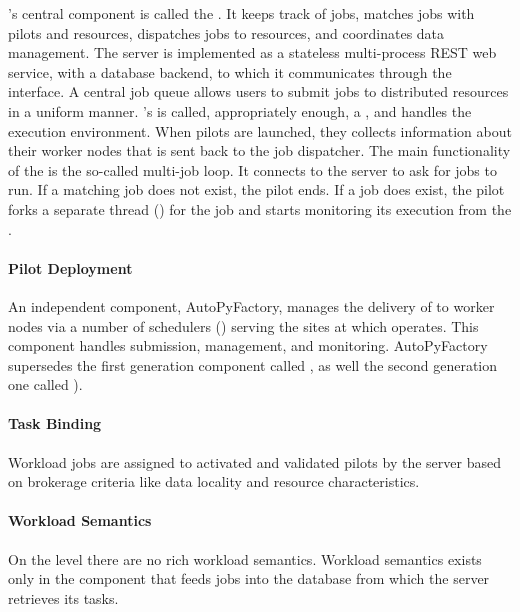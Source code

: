 \documentclass{sig-alternate}
\begin{document}
\panda's central component is called the . It keeps track
of jobs, matches jobs with pilots and resources, dispatches jobs to resources,
and coordinates data management.
The \panda server is implemented as a stateless multi-process REST web service,
with a database backend, to which it communicates through the 
interface.
A central job queue allows users to submit jobs to distributed resources in a
uniform manner.
\panda's \vocab{\pilot} is called, appropriately enough, a , and
handles the execution environment.
When pilots are launched, they collects information about their worker nodes
that is sent back to the job dispatcher.
The main functionality of the \pilot is the so-called multi-job loop.  It
connects to the \panda server to ask for jobs to run.  If a matching job does
not exist, the pilot ends. If a job does exist, the pilot forks a separate
thread () for the job and starts monitoring its execution from
the .

\paragraph{Pilot Deployment}

An independent component, AutoPyFactory\cite{Caballero:2012ka}, manages the
delivery of \pilots to worker nodes via a number of schedulers () serving the sites at which \panda operates.
This component handles \pilot submission, management, and monitoring.
AutoPyFactory supersedes the first generation component called
, as well the second generation one called
).

\paragraph{Task Binding}

Workload jobs are assigned to activated and validated pilots by the \panda
server based on brokerage criteria like data locality and resource
characteristics.

\paragraph{Workload Semantics}

On the \pilot level there are no rich workload semantics.
Workload semantics exists only in the  component that feeds
jobs into the database from which the \panda server retrieves its tasks.
\end{document}
